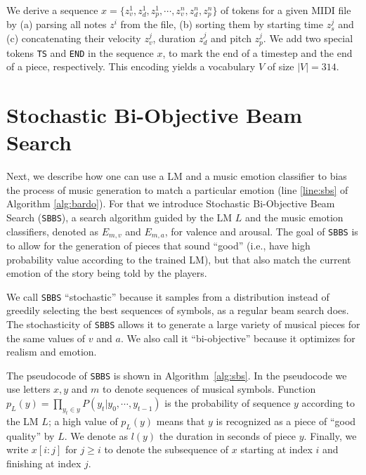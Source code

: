 We derive a sequence $x = \{z_v^1, z_{d}^1, z_{p}^1, \cdots, z_v^n,
z_{d}^n, z_p^n\}$ of tokens for a given MIDI file by (a)
parsing all notes $z^i$ from the file, (b) sorting them by
starting time $z_s^j$ and (c) concatenating their velocity $z_v^j$,
duration $z_d^j$ and pitch $z_p^j$. We add two special tokens
\texttt{TS} and \texttt{END} in the sequence $x$, to mark
the end of a timestep and the end of a piece, respectively.
This encoding yields a vocabulary $V$ of size $|V| = 314$.

\section{Stochastic Bi-Objective Beam Search}

Next, we describe how one can use a LM and a music emotion classifier to bias the process of music generation to match a particular emotion (line \ref{line:sbs} of Algorithm \ref{alg:bardo}). For that we introduce Stochastic Bi-Objective Beam Search (\texttt{SBBS}), a search algorithm guided by the LM $L$ and the music emotion classifiers, denoted as $E_{m, v}$ and $E_{m, a}$, for valence and arousal. The goal of \texttt{SBBS} is to allow for the generation of pieces that sound ``good'' (i.e., have high probability value according to the trained LM), but that also match the current emotion of the story being told by the players.

We call \texttt{SBBS} ``stochastic'' because it samples from a distribution instead of greedily selecting the best sequences of symbols, as a regular beam search does. The stochasticity of \texttt{SBBS} allows it to generate a large variety of musical pieces for the same values of $v$ and $a$.  We
also call it ``bi-objective'' because it optimizes for realism and emotion.

The pseudocode of \texttt{SBBS} is shown in Algorithm~\ref{alg:sbs}. In the pseudocode we use letters $x, y$ and $m$ to denote sequences of musical symbols. Function $p_L(y) = \prod_{y_t \in y} P(y_t|y_0, \cdots, y_{t-1})$ is the probability of sequence $y$ according to the LM $L$; a high value of $p_L(y)$ means that $y$ is recognized as a piece of
``good quality'' by $L$. We denote as $l(y)$ the duration in seconds of piece $y$. Finally, we write $x[i:j]$ for $j \geq i$ to denote the subsequence of $x$ starting at index $i$ and finishing at index $j$.


